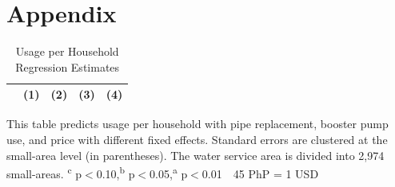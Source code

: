 \documentclass[12pt,table]{article}
\newcommand{\regtext}{
Standard errors are clustered at the small-area level (in parentheses).  The water service area is divided into 2,974 small-areas.
\textsuperscript{c} p$<$0.10,\textsuperscript{b} p$<$0.05,\textsuperscript{a} p$<$0.01 \,\,
}
\begin{document}









\section{Appendix}





\begin{table}[h!] 
\centering
\caption{Usage per Household Regression Estimates}\label{table:usageregs}
\vspace{-2mm}
\begin{threeparttable}
\begin{tabular}{@{}l*{1}{cccc}@{}}
\toprule
  & (1) & (2) & (3) & (4) \\
\midrule

\bottomrule
\end{tabular}
\begin{tablenotes}
\footnotesize
\item This table predicts usage per household with pipe replacement, booster pump use, and price with different fixed effects.   \regtext 45 PhP = 1 USD \,\,
\end{tablenotes}
\end{threeparttable}
\end{table}
\end{document}
